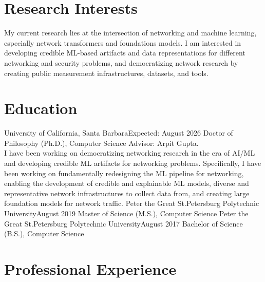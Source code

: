 \documentclass{scv}
\begin{document}

\section{Research Interests}
    \justifying
    My current research lies at the intersection of networking and machine learning, especially network transformers and foundations models. 
    I am interested in developing credible ML-based artifacts and data representations for different networking and security problems, and democratizing network research by creating public measurement infrastructures, datasets, and tools.

\section{Education}
  \resumeSubHeadingListStart
    \resumeSubheadingWithText
      {University of California, Santa Barbara}{Expected: August 2026}
      {Doctor of Philosophy (Ph.D.), Computer Science}{}
      {Advisor: Arpit Gupta.\\
        I have been working on democratizing networking research in the era of AI/ML and developing credible ML artifacts for networking problems.%
        Specifically, I have been working on fundamentally redesigning the ML pipeline for networking, enabling the development of credible and explainable ML models, diverse and representative network infrastructures to collect data from, and %
        creating large foundation models for network traffic.}{}
    \resumeSubheading
      {Peter the Great St.Petersburg Polytechnic University}{August 2019}
      {Master of Science (M.S.), Computer Science}{}
    \resumeSubheading
      {Peter the Great St.Petersburg Polytechnic University}{August 2017}
      {Bachelor of Science (B.S.), Computer Science}{}
  \resumeSubHeadingListEnd
    
\section{Professional Experience}
  \resumeSubHeadingListStart
\end{document}
